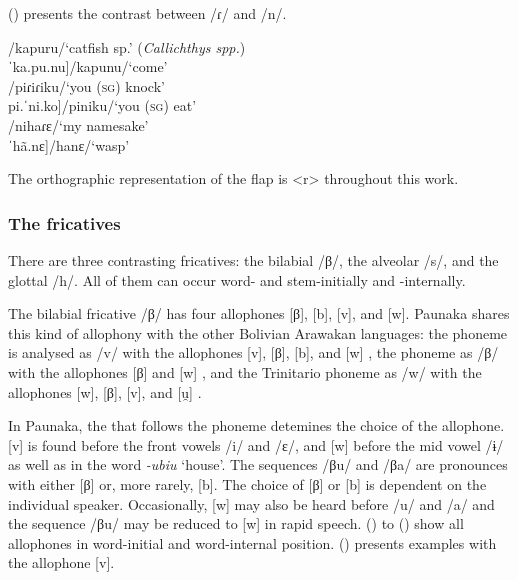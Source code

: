 () presents the contrast between /ɾ/ and /n/.
    
\ea\label{ex:r-n}
\ea     \tab[ka.ˈpu.ɾu]\tab /kapuru/\tab ‘catfish sp.’ (\textit{Callichthys spp.}) \\
    \tab{[}ˈka.pu.nu]\tab /kapunu/\tab ‘come’\\
\ex    \tab[pi.ˈɾi.ɾi.ku]\tab /piɾiɾiku/\tab ‘you (\textsc{sg}) knock’\\
    \tab{[}pi.ˈni.ko]\tab /piniku/\tab ‘you (\textsc{sg}) eat’\\
\ex    \tab[ni.ˈhã.ɾɛ]\tab /nihaɾɛ/\tab ‘my namesake’\\
    \tab{[}ˈhã.nɛ]\tab /hanɛ/\tab\tab ‘wasp’\\%
\z
\xe     
   
The orthographic representation of the flap is <r> throughout this work.

\subsubsection{The fricatives} \label{par:Fricatives}
There are three contrasting fricatives: the bilabial /β/, the alveolar /s/, and the glottal /h/. All of them can occur word- and stem-initially and -internally. 

The bilabial fricative /β/ \label{par:BilabialFricative} has four allophones [β], [b], [v], and [w]. Paunaka shares this kind of allophony with the other Bolivian Arawakan languages: the  phoneme is analysed as /v/ with the allophones [v], [β], [b], and [w] \citep[43]{Danielsen2007}, the  phoneme as /β/ with the allophones [β] and [w] \citep[6]{OttOtt1983}, and the Trinitario phoneme as /w/ with the allophones [w], [β], [v], and [u̯] \citep[10]{Rose2021}.

In Paunaka, the  that follows the phoneme detemines the choice of the allophone. [v] is found before the front vowels /i/ and /ɛ/, and [w] before the mid vowel /ɨ/ as well as in the word \textit{-ubiu} ‘house’. The sequences /βu/ and /βa/ are pronounces with either [β] or, more rarely, [b]. The choice of [β] or [b] is dependent on the individual speaker. %
 Occasionally, [w] may also be heard before /u/ and /a/ and the sequence /βu/ may be reduced to [w] in rapid speech.
() to () show all allophones in word-initial and word-internal position. () presents examples with the allophone [v].
 


